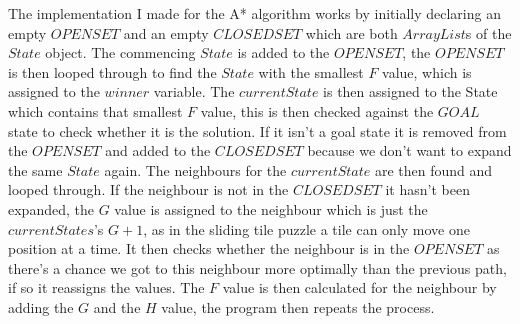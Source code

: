 \documentclass[progress]{cmpreport}
\begin{document}
The implementation I made for the A* algorithm works by initially declaring an empty $OPENSET$ and an empty $CLOSEDSET$ which are both  $ArrayList$s of the $State$ object. The commencing $State$ is added to the $OPENSET$, the $OPENSET$ is then looped through to find the $State$ with the smallest $F$ value, which is assigned to the $winner$ variable. The $currentState$ is then assigned to the State which contains that smallest $F$ value, this is then checked against the $GOAL$ state to check whether it is the solution. If it isn't a goal state it is removed from the $OPENSET$ and added to the $CLOSEDSET$ because we don't want to expand the same $State$ again.
The neighbours for the $currentState$ are then found and looped through. If the neighbour is not in the $CLOSEDSET$ it hasn't been expanded, the $G$ value is assigned to the neighbour which is just the $currentStates$'s $G+1$, as in the sliding tile puzzle a tile can only move one position at a time. It then checks whether the neighbour is in the $OPENSET$ as there's a chance we got to this neighbour more optimally than the previous path, if so it reassigns the values. The $F$ value is then calculated for the neighbour by adding the $G$ and the $H$ value, the program then repeats the process.
\end{document}
